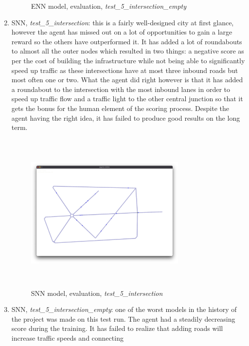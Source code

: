 \documentclass[
]{elteikthesis}[2023/04/10]
\begin{document}
\begin{enumerate}
\begin{figure}[H]
\begin{centering}
\par\end{centering}
\caption{ENN model, evaluation, \emph{test\_5\_intersection\_empty}}
\end{figure}
\item SNN, \emph{test\_5\_intersection}: this is a fairly well-designed
city at first glance, however the agent has missed out on a lot of
opportunities to gain a large reward so the others have outperformed
it. It has added a lot of roundabouts to almost all the outer nodes
which resulted in two things: a negative score as per the cost of
building the infrastructure while not being able to significantly
speed up traffic as these intersections have at most three inbound
roads but most often one or two. What the agent did right however
is that it has added a roundabout to the intersection with the most
inbound lanes in order to speed up traffic flow and a traffic light
to the other central junction so that it gets the bonus for the human
element of the scoring process. Despite the agent having the right
idea, it has failed to produce good results on the long term.
\begin{figure}[H]
\begin{centering}
\includegraphics[width=8cm,height=8cm,keepaspectratio]{images/city_agent_snn_2023-05-04_14-28_test_5_intersection}
\par\end{centering}
\caption{SNN model, evaluation, \emph{test\_5\_intersection}}
\end{figure}
\item SNN, \emph{test\_5\_intersection\_empty}: one of the worst models
in the history of the project was made on this test run. The agent
had a steadily decreasing score during the training. It has failed
to realize that adding roads will increase traffic speeds and connecting

\end{enumerate}
\end{document}
